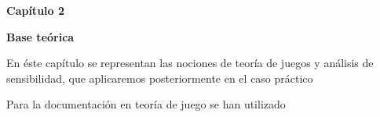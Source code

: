 \documentclass[11pt, a4paper]{article} %
\begin{document}
\newpage

{\bfseries \large Capítulo 2 }\vspace{10mm} 

{\bfseries \large Base teórica} \vspace{15mm}

En éste capítulo se representan las nociones de teoría de juegos y análisis de sensibilidad, que aplicaremos posteriormente en el caso práctico 

Para la documentación en teoría de juego se han utilizado



\newpage

\end{document}
